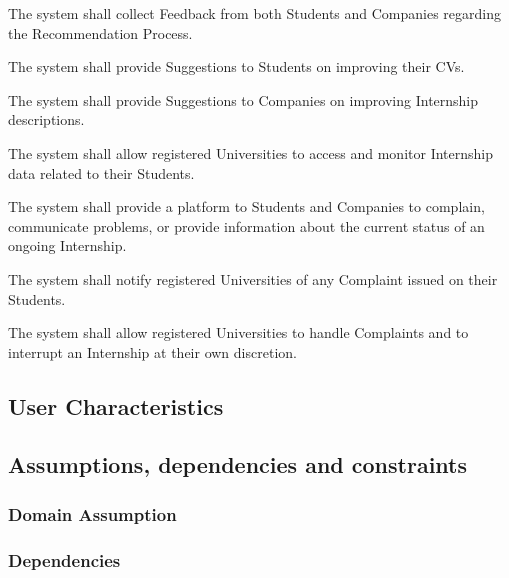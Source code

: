 \begin{enumerate}[label={\color{titleColor}[R\arabic*]}]
    \item The system shall collect Feedback from both Students and Companies regarding the Recommendation Process.
    \item The system shall provide Suggestions to Students on improving their CVs.
    \item The system shall provide Suggestions to Companies on improving Internship descriptions.
    
    \item The system shall allow registered Universities to access and monitor Internship data related to their Students.
    \item The system shall provide a platform to Students and Companies to complain, communicate problems, or provide information about the current status of an ongoing Internship.
    \item The system shall notify registered Universities of any Complaint issued on their Students.
    \item The system shall allow registered Universities to handle Complaints and to interrupt an Internship at their own discretion.
\end{enumerate}


\subsection{User Characteristics}


\subsection{Assumptions, dependencies and constraints}

\subsubsection{Domain Assumption}

\subsubsection{Dependencies}